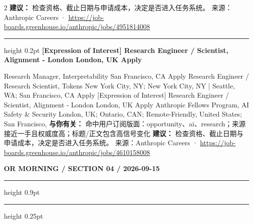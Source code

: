 \documentclass[10.5pt]{ctexart}
\begin{document}
\begin{multicols}{2}
\textbf{建议：} 检查资格、截止日期与申请成本，决定是否进入任务系统。
{\footnotesize\color{ormuted} 来源：Anthropic Careers · \url{https://job-boards.greenhouse.io/anthropic/jobs/4951814008}}
\vspace{2mm}
\hrule height 0.2pt
\vspace{2mm}
{\large\bfseries [Expression of Interest] Research Engineer / Scientist, Alignment - London London, UK Apply}\par
[Expression of Interest] Research Manager, Interpretability San Francisco, CA Apply Research Engineer / Research Scientist, Tokens New York City, NY; New York City, NY | Seattle, WA; San Francisco, CA Apply [Expression of Interest] Research Engineer / Scientist, Alignment - London London, UK Apply Anthropic Fellows Program, AI Safety \& Security London, UK; Ontario, CAN; Remote-Friendly, United States; San Francisco, 
\textbf{与你有关：} 命中用户订阅版面：opportunity、ai、research；来源接近一手且权威度高；标题/正文包含高信号变化
\textbf{建议：} 检查资格、截止日期与申请成本，决定是否进入任务系统。
{\footnotesize\color{ormuted} 来源：Anthropic Careers · \url{https://job-boards.greenhouse.io/anthropic/jobs/4610158008}}
\end{multicols}
\newpage
{\small\bfseries OR MORNING / SECTION 04 / 2026-09-15}
\vspace{2mm}
\hrule height 0.9pt
\vspace{1.5mm}
\hrule height 0.25pt
\vspace{4mm}
\end{document}
